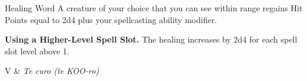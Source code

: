 \begin{Spell}[
    level=1st,
    time=1 Bonus Action,
    range=60 ft.,
    components={V},
    duration=Instantaneous,
    school=Abjuration,
    attack=None,
    effect=Healing
]{Healing Word}
A creature of your choice that you can see within range regains Hit Points equal to 2d4 plus your spellcasting ability modifier.

\textbf{Using a Higher-Level Spell Slot.} The healing increases by 2d4 for each spell slot level above 1.

\begin{components}
V & \textit{Te curo (te KOO-ro)}
\end{components}
\end{Spell}

